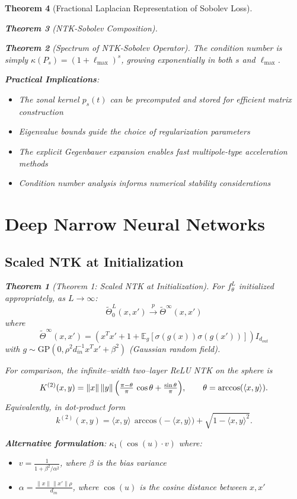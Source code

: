 \documentclass{article}
\newtheorem{theorem}{Theorem}[section]
\newcommand{\E}{\mathbb{E}}
\begin{document}
\begin{theorem}[Fractional Laplacian Representation of Sobolev Loss]
\begin{theorem}[NTK-Sobolev Composition]
\begin{theorem}[Spectrum of NTK-Sobolev Operator]
The condition number is simply $\kappa(P_s) = (1 + \ell_{\max})^s$, growing exponentially in both $s$ and $\ell_{\max}$.

\textbf{Practical Implications}:
\begin{itemize}
\item The zonal kernel $p_s(t)$ can be precomputed and stored for efficient matrix construction
\item Eigenvalue bounds guide the choice of regularization parameters
\item The explicit Gegenbauer expansion enables fast multipole-type acceleration methods
\item Condition number analysis informs numerical stability considerations
\end{itemize}



\section{Deep Narrow Neural Networks}

\subsection{Scaled NTK at Initialization}

\begin{theorem}[Theorem 1: Scaled NTK at Initialization]
For $f^L_\theta$ initialized appropriately, as $L \to \infty$:
\[ \tilde{\Theta}^L_0(x, x') \xrightarrow{p} \tilde{\Theta}^\infty(x, x') \]
where
\[ \tilde{\Theta}^\infty(x, x') = (x^T x' + 1 + \E_g[\sigma(g(x))\sigma(g(x'))]) I_{d_{out}} \]
with $g \sim \text{GP}(0, \rho^2 d_{in}^{-1} x^T x' + \beta^2)$ (Gaussian random field).
\end{theorem}

For comparison, the infinite–width two–layer ReLU NTK on the sphere is
\[
  K^{(2)}(x,y)=\|x\|\,\|y\|\,\Bigl(\tfrac{\pi-\theta}{\pi}\,\cos \theta + \tfrac{\sin\theta}{\pi}\Bigr),\qquad \theta=\arccos(\langle x,y\rangle).
\]
Equivalently, in dot-product form
\[
  k^{(2)}(x,y)=\langle x,y\rangle\,\arccos\bigl(-\langle x,y\rangle\bigr)+\sqrt{1-\langle x,y\rangle^{2}}.
\]

\textbf{Alternative formulation}: $\kappa_1(\cos(u) \cdot v)$ where:
\begin{itemize}
\item $v = \frac{1}{1 + \beta^2/\alpha^2}$, where $\beta$ is the bias variance
\item $\alpha = \frac{\|x\| \|x'\| \rho}{d_{in}}$, where $\cos(u)$ is the cosine distance between $x, x'$
\end{itemize}


\end{theorem}
\end{theorem}
\end{theorem}
\end{document}
